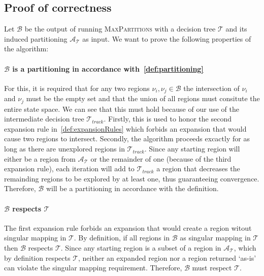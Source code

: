 \subsection{Proof of correctness}%
\label{sec:proofCorrectness}

\noindent
Let $\mathcal{B}$ be the output of running \textsc{MaxPartitions} with a
decision tree $\mathcal{T}$ and its induced partitioning
$\mathcal{A}_{\mathcal{T}}$ as input. We want to prove the following properties
of the algorithm:

\paragraph{$\mathcal{B}$ is a partitioning in accordance
with~\cref{def:partitioning}} For this, it is required that for any two regions
$\nu_{i}, \nu_{j} \in \mathcal{B}$ the intersection of $\nu_{i}$ and $\nu_{j}$
must be the empty set and that the union of all regions must consitute the
entire state space. We can see that this must hold because of our use of the
intermediate decision tree $\mathcal{T}_{track}$. Firstly, this is used to honor
the second expansion rule in~\cref{def:expansionRules} which forbids an
expansion that would cause two regions to intersect. Secondly, the algorithm
proceeds excactly for as long as there are unexplored regions in
$\mathcal{T}_{track}$. Since any starting region will either be a region from
$\mathcal{A}_{\mathcal{T}}$ or the remainder of one (because of the third
expansion rule), each iteration will add to $\mathcal{T}_{track}$ a region that
decreases the remainding regions to be explored by at least one, thus
guaranteeing convergence. Therefore, $\mathcal{B}$ will be a partitioning in
accordance with the definition.

\paragraph{$\mathcal{B}$ respects $\mathcal{T}$} The first expansion rule
forbids an expansion that would create a region witout singular mapping in
$\mathcal{T}$. By definition, if all regions in $\mathcal{B}$ as singular
mapping in $\mathcal{T}$ then $\mathcal{B}$ respects $\mathcal{T}$. Since any
starting region is a subset of a region in $\mathcal{A}_{\mathcal{T}}$, which by
definition respects $\mathcal{T}$, neither an expanded region nor a region
returned `as-is' can violate the singular mapping requirement. Therefore,
$\mathcal{B}$ must respect $\mathcal{T}$.

